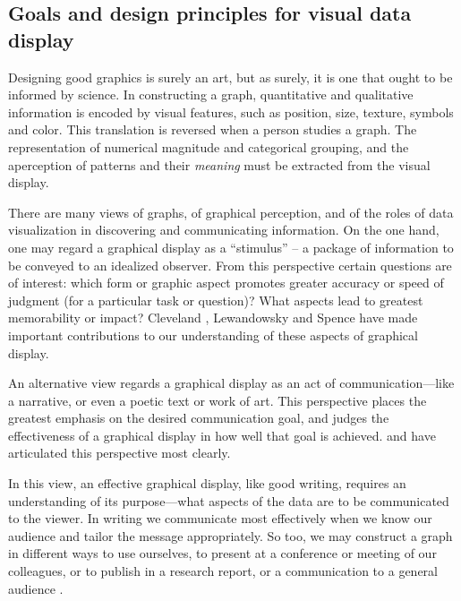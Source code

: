 \subsection{Goals and design principles for visual data display}\label{sec:intro-goals}

Designing good graphics is surely an art, but as surely, it is
one that ought to be informed by science.
In constructing a graph, quantitative and qualitative information is
encoded by visual features, such as position, size, texture, symbols
and color. This translation is reversed when a person studies a
graph. The representation of numerical magnitude and categorical
grouping, and the aperception of patterns and their \emph{meaning} must be extracted from the visual display.  

There are many views of graphs, of graphical perception, and of
the roles of data visualization in discovering and communicating
information.
On the one hand, one may regard a graphical display as a ``stimulus'' --
a package of information to be conveyed to an idealized observer.
From this perspective certain questions are of interest:  which
form or graphic aspect promotes greater accuracy or speed of judgment
(for a particular task or question)?  What aspects lead to greatest
memorability or impact? 
Cleveland \citep{ClevelandMcGill:84b,ClevelandMcGill:85,Cleveland:93:JCGS},
Lewandowsky and
Spence
\citep{LewandowskySpence:89,Spence:90} have made important contributions to our understanding of
these aspects of graphical display.

An alternative view regards a graphical display as an act
of communication---like a narrative, or even a poetic text or work of art. 
This perspective places the greatest emphasis on the desired
communication goal, and judges the effectiveness of a graphical
display in how well that goal is achieved.
\citet{Kosslyn:85,Kosslyn:89} and \citet{Tufte:83,Tufte:90,Tufte:97}
have articulated this perspective most clearly.

In this view,
an effective graphical display, like good writing, requires an
understanding of its purpose---what aspects of the data are to be
communicated to the viewer.  In writing we communicate most
effectively when we know our audience and tailor the message
appropriately. So too, we may construct a graph in different ways to
use ourselves, to present at a conference or meeting of our
colleagues, or to publish in a research report, or a communication
to a general audience
\cite[Ch. 1]{Friendly:91}.

